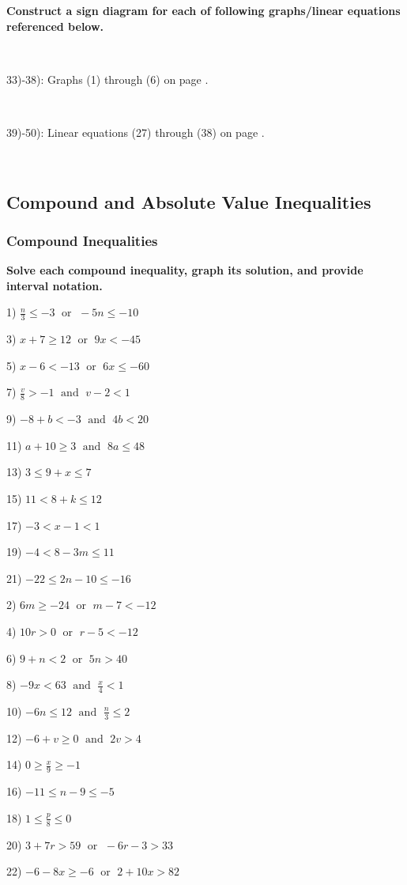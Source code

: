 \documentclass[11pt]{book}
\newcommand{\tmop}[1]{\ensuremath{\operatorname{#1}}}
\newcommand{\tmstrong}[1]{\textbf{#1}}
\theoremstyle{definition}  %
\newcommand{\pp}{\par~\par}
\begin{document}
{\tmstrong{Construct a sign diagram for each of following graphs/linear equations referenced below.}}\pp

33)-38): Graphs (1) through (6) on page \pageref{lineargraphs1}.\pp

39)-50): Linear equations (27) through (38) on page \pageref{lineargraphs2}.\pp


\pagebreak

\subsection{Compound and Absolute Value Inequalities}\par

\subsubsection{Compound Inequalities}\par

{\tmstrong{Solve each compound inequality, graph its solution, and provide interval notation.}}

\begin{multicols}{2}
  1) $\frac{n}{3} \leq - 3 \tmop{~or~} - 5 n \leq - 10$
  
  3) $x + 7 \geq 12 \tmop{~or~} 9 x < - 45$
  
  5) $x - 6 < - 13 \tmop{~or~} 6 x \leq - 60$
  
  7) $\frac{v}{8} > - 1 \tmop{~and~} v - 2 < 1$
  
  9) $- 8 + b < - 3 \tmop{~and~} 4 b < 20$
  
  11) $a + 10 \geq 3 \tmop{~and~} 8 a \leq 48$
  
  13) $3 \leq 9 + x \leq 7$
  
  15) $11 < 8 + k \leq 12$
  
  17) $- 3 < x - 1 < 1$
  
  19) $- 4 < 8 - 3 m \leq 11$
  
  21) $- 22 \leq 2 n - 10 \leq - 16$
  
  2) $6 m \geq - 24 \tmop{~or~} m - 7 < - 12$
  
  4) $10 r > 0 \tmop{~or~} r - 5 < - 12$
  
  6) $9 + n < 2 \tmop{~or~} 5 n > 40$
  
  8) $- 9 x < 63 \tmop{~and~} \frac{x}{4} < 1$
  
  10) $- 6 n \leq 12 \tmop{~and~} \frac{n}{3} \leq 2$
  
  12) $- 6 + v \geq 0 \tmop{~and~} 2 v > 4$
  
  14) $0 \geq \frac{x}{9} \geq - 1$
  
  16) $- 11 \leq n - 9 \leq - 5$
  
  18) $1 \leq \frac{p}{8} \leq 0$
  
  20) $3 + 7 r > 59 \tmop{~or~} - 6 r - 3 > 33$
  
  22) $- 6 - 8 x \geq - 6 \tmop{~or~} 2 + 10 x > 82$
  
\end{multicols}
\end{document}
